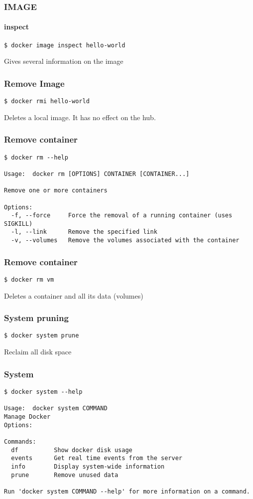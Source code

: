 \begin{frame}[fragile]
\frametitle{IMAGE}
\framesubtitle{inspect}
\begin{lstlisting}
$ docker image inspect hello-world
\end{lstlisting}

Gives several information on the image
\end{frame}


\begin{frame}[fragile]
\frametitle{Remove Image}
\begin{lstlisting}
$ docker rmi hello-world
\end{lstlisting}

Deletes a local image. It has no effect on the hub.
\end{frame}

\begin{frame}[fragile]
\frametitle{Remove container}
\scriptsize
\begin{lstlisting}[breaklines=true]
$ docker rm --help

Usage:  docker rm [OPTIONS] CONTAINER [CONTAINER...]

Remove one or more containers

Options:
  -f, --force     Force the removal of a running container (uses SIGKILL)
  -l, --link      Remove the specified link
  -v, --volumes   Remove the volumes associated with the container
\end{lstlisting}
\normalsize
\end{frame}

\begin{frame}[fragile]
\frametitle{Remove container}
\begin{lstlisting}
$ docker rm vm
\end{lstlisting}
Deletes a container and all its data (volumes) 
\end{frame}

\begin{frame}[fragile]
\frametitle{System pruning}
\begin{lstlisting}
$ docker system prune
\end{lstlisting}

Reclaim all disk space
\end{frame}

\begin{frame}[fragile]
\frametitle{System}
\scriptsize
\begin{lstlisting}[breaklines=true]
$ docker system --help

Usage:  docker system COMMAND
Manage Docker
Options:

Commands:
  df          Show docker disk usage
  events      Get real time events from the server
  info        Display system-wide information
  prune       Remove unused data

Run 'docker system COMMAND --help' for more information on a command.
\end{lstlisting}
\normalsize
\end{frame}

